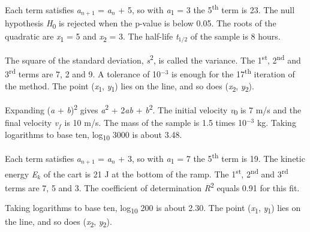 \documentclass[11pt]{article}
\begin{document}
Each term satisfies \textit{a}$_{n+1}$ = \textit{a}$_{n}$ + 5, so with \textit{a}\textsubscript{1} = 3 the 5\textsuperscript{th} term is 23. The null hypothesis \textit{H}\textsubscript{0} is rejected when the p-value is below 0.05. The roots of the quadratic are \textit{x}\textsubscript{1} = 5 and \textit{x}\textsubscript{2} = 3. The half-life \textit{t}$_{1/2}$ of the sample is 8 hours.

The square of the standard deviation, \textit{s}\textsuperscript{2}, is called the variance. The 1\textsuperscript{st}, 2\textsuperscript{nd} and 3\textsuperscript{rd} terms are 7, 2 and 9. A tolerance of 10$^{-3}$ is enough for the 17\textsuperscript{th} iteration of the method. The point (\textit{x}\textsubscript{1}, \textit{y}\textsubscript{1}) lies on the line, and so does (\textit{x}\textsubscript{2}, \textit{y}\textsubscript{2}).

Expanding (\textit{a} + \textit{b})\textsuperscript{2} gives \textit{a}\textsuperscript{2} + 2\textit{ab} + \textit{b}\textsuperscript{2}. The initial velocity \textit{v}\textsubscript{0} is 7 m/s and the final velocity \textit{v}$_{f}$ is 10 m/s. The mass of the sample is 1.5 times 10$^{-3}$ kg. Taking logarithms to base ten, log\textsubscript{10} 3000 is about 3.48.

Each term satisfies \textit{a}$_{n+1}$ = \textit{a}$_{n}$ + 3, so with \textit{a}\textsubscript{1} = 7 the 5\textsuperscript{th} term is 19. The kinetic energy \textit{E}$_{k}$ of the cart is 21 J at the bottom of the ramp. The 1\textsuperscript{st}, 2\textsuperscript{nd} and 3\textsuperscript{rd} terms are 7, 5 and 3. The coefficient of determination \textit{R}\textsuperscript{2} equals 0.91 for this fit.

Taking logarithms to base ten, log\textsubscript{10} 200 is about 2.30. The point (\textit{x}\textsubscript{1}, \textit{y}\textsubscript{1}) lies on the line, and so does (\textit{x}\textsubscript{2}, \textit{y}\textsubscript{2}).
\end{document}
